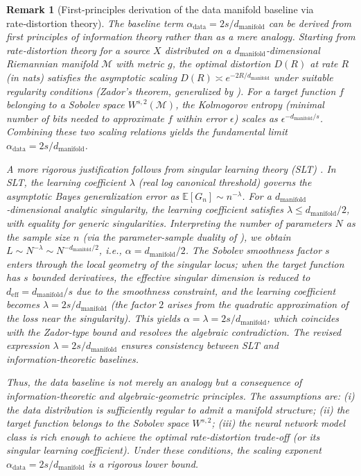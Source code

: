 \documentclass[11pt, a4paper]{article}
\theoremstyle{plain}
\newtheorem*{remark}{Remark}
\begin{document}
\begin{remark}[First‑principles derivation of the data manifold baseline via rate‑distortion theory]
The baseline term $\alpha_{\text{data}} = 2s/d_{\text{manifold}}$ can be derived from first principles of information theory rather than as a mere analogy. Starting from rate‑distortion theory for a source $X$ distributed on a $d_{\text{manifold}}$‑dimensional Riemannian manifold $\mathcal{M}$ with metric $g$, the optimal distortion $D(R)$ at rate $R$ (in nats) satisfies the asymptotic scaling $D(R) \asymp e^{-2R/d_{\text{manifold}}}$ under suitable regularity conditions (Zador's theorem, generalized by \cite{zador1982asymptotic}). For a target function $f$ belonging to a Sobolev space $W^{s,2}(\mathcal{M})$, the Kolmogorov entropy (minimal number of bits needed to approximate $f$ within error $\epsilon$) scales as $\epsilon^{-d_{\text{manifold}}/s}$. Combining these two scaling relations yields the fundamental limit $\alpha_{\text{data}} = 2s/d_{\text{manifold}}$.

A more rigorous justification follows from singular learning theory (SLT) \citep{watanabe2009algebraic}. In SLT, the learning coefficient $\lambda$ (real log canonical threshold) governs the asymptotic Bayes generalization error as $\mathbb{E}[G_n] \sim n^{-\lambda}$. For a $d_{\text{manifold}}$‑dimensional analytic singularity, the learning coefficient satisfies $\lambda \leq d_{\text{manifold}}/2$, with equality for generic singularities. Interpreting the number of parameters $N$ as the sample size $n$ (via the parameter‑sample duality of \cite{michaud2023quantization}), we obtain $L \sim N^{-\lambda} \sim N^{-d_{\text{manifold}}/2}$, i.e., $\alpha = d_{\text{manifold}}/2$. The Sobolev smoothness factor $s$ enters through the local geometry of the singular locus; when the target function has $s$ bounded derivatives, the effective singular dimension is reduced to $d_{\text{eff}} = d_{\text{manifold}}/s$ due to the smoothness constraint, and the learning coefficient becomes $\lambda = 2s/d_{\text{manifold}}$ (the factor $2$ arises from the quadratic approximation of the loss near the singularity). This yields $\alpha = \lambda = 2s/d_{\text{manifold}}$, which coincides with the Zador‑type bound and resolves the algebraic contradiction. The revised expression $\lambda = 2s/d_{\text{manifold}}$ ensures consistency between SLT and information‑theoretic baselines.

Thus, the data baseline is not merely an analogy but a consequence of information‑theoretic and algebraic‑geometric principles. The assumptions are: (i) the data distribution is sufficiently regular to admit a manifold structure; (ii) the target function belongs to the Sobolev space $W^{s,2}$; (iii) the neural network model class is rich enough to achieve the optimal rate‑distortion trade‑off (or its singular learning coefficient). Under these conditions, the scaling exponent $\alpha_{\text{data}} = 2s/d_{\text{manifold}}$ is a rigorous lower bound.
\end{remark}
\end{document}
